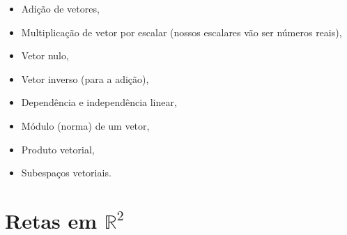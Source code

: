 \documentclass[
  letterpaper,
  DIV=11,
  numbers=noendperiod]{scrreprt}
\providecommand{\tightlist}{%
  \setlength{\itemsep}{0pt}\setlength{\parskip}{0pt}}\usepackage{longtable,booktabs,array}
\begin{document}
\begin{itemize}
  \begin{itemize}
  \tightlist
  \item
    Adição de vetores,
  \item
    Multiplicação de vetor por escalar (nossos escalares vão ser números
    reais),
  \item
    Vetor nulo,
  \item
    Vetor inverso (para a adição),
  \item
    Dependência e independência linear,
  \item
    Módulo (norma) de um vetor,
  \item
    Produto vetorial,
  \item
    Subespaços vetoriais.
  \end{itemize}
\end{itemize}

\hypertarget{retas-em-mathbbr2}{%
\section{\texorpdfstring{Retas em
$\mathbb{R}^2$}{Retas em }}\label{retas-em-mathbbr2}}
\end{document}
